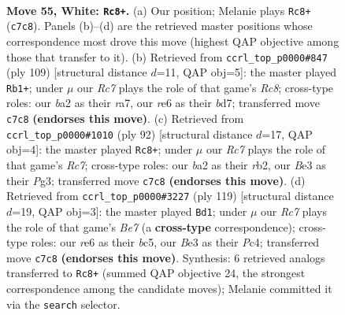\documentclass[11pt]{article}
\begin{document}
\clearpage

\begin{figure}[p]\centering
\begin{subfigure}{0.46\textwidth}\centering
\resizebox{\linewidth}{!}{%
\newchessgame
\chessboard[
  setfen={7k/2R5/4r3/8/B3p2p/4Bp1P/b4P2/6K1 w - - 20 55},
  showmover=false,
  pgfstyle=straightmove, color=movearrow, markmove={c7-c8}
]}
\caption{}
\end{subfigure}\hfill
\begin{subfigure}{0.46\textwidth}\centering
\resizebox{\linewidth}{!}{%
\newchessgame
\chessboard[
  setfen={5k2/R2B1p2/3p4/4b1pP/1K2P1P1/8/8/2r5 b - - 26 55},
  showmover=false,
  pgfstyle=straightmove, color=movearrow, markmove={c1-b1}
]}
\caption{}
\end{subfigure}
\\[4pt]
\begin{subfigure}{0.46\textwidth}\centering
\resizebox{\linewidth}{!}{%
\newchessgame
\chessboard[
  setfen={7k/2R2B2/8/5p2/1b3P2/p3K1PP/1r6/8 w - - 0 47},
  showmover=false,
  pgfstyle=straightmove, color=movearrow, markmove={c7-c8}
]}
\caption{}
\end{subfigure}\hfill
\begin{subfigure}{0.46\textwidth}\centering
\resizebox{\linewidth}{!}{%
\newchessgame
\chessboard[
  setfen={8/8/p7/P1Bp1k2/2p4K/2P1P3/4b1P1/8 b - - 8 60},
  showmover=false,
  pgfstyle=straightmove, color=movearrow, markmove={e2-d1}
]}
\caption{}
\end{subfigure}
\caption{\textbf{Move 55, White: \texttt{Rc8+}.} (a) Our position; Melanie plays \texttt{Rc8+} (\texttt{c7c8}). Panels (b)--(d) are the retrieved master positions whose correspondence most drove this move (highest QAP objective among those that transfer to it). (b) Retrieved from \texttt{ccrl\_top\_p0000\#847} (ply 109) [structural distance $d$=11, QAP obj=5]: the master played \texttt{Rb1+}; under $\mu$ our \emph{Rc7} plays the role of that game's \emph{Rc8}; cross-type roles: our \emph{b}a2 as their \emph{r}a7, our \emph{r}e6 as their \emph{b}d7; transferred move \texttt{c7c8} \textbf{(endorses this move)}. (c) Retrieved from \texttt{ccrl\_top\_p0000\#1010} (ply 92) [structural distance $d$=17, QAP obj=4]: the master played \texttt{Rc8+}; under $\mu$ our \emph{Rc7} plays the role of that game's \emph{Rc7}; cross-type roles: our \emph{b}a2 as their \emph{r}b2, our \emph{B}e3 as their \emph{P}g3; transferred move \texttt{c7c8} \textbf{(endorses this move)}. (d) Retrieved from \texttt{ccrl\_top\_p0000\#3227} (ply 119) [structural distance $d$=19, QAP obj=3]: the master played \texttt{Bd1}; under $\mu$ our \emph{Rc7} plays the role of that game's \emph{Be7} (a \textbf{cross-type} correspondence); cross-type roles: our \emph{r}e6 as their \emph{b}c5, our \emph{B}e3 as their \emph{P}c4; transferred move \texttt{c7c8} \textbf{(endorses this move)}. Synthesis: 6 retrieved analogs transferred to \texttt{Rc8+} (summed QAP objective 24, the strongest correspondence among the candidate moves); Melanie committed it via the \texttt{search} selector.}
\label{fig:thought-m108}
\end{figure}
\end{document}
